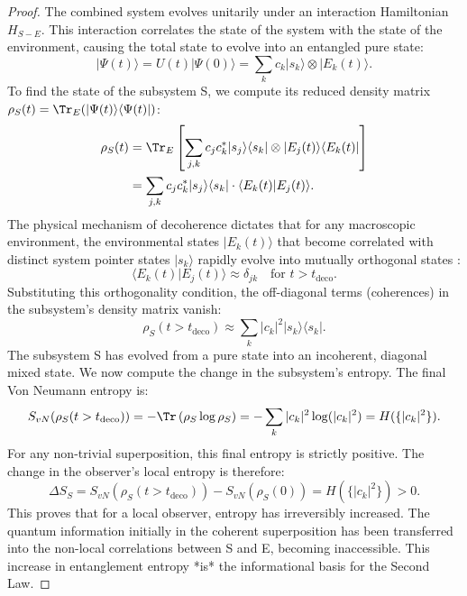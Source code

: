 \documentclass[11pt, letterpaper]{report}
\theoremstyle{plain} %
\theoremstyle{definition} %
\theoremstyle{remark} %
\begin{document}
\begin{proof}
The combined system evolves unitarily under an interaction Hamiltonian $H_{S-E}$. This interaction correlates the state of the system with the state of the environment, causing the total state to evolve into an entangled pure state:
\begin{equation}
    |\Psi(t)\rangle = U(t)|\Psi(0)\rangle = \sum_k c_k |s_k\rangle \otimes |E_k(t)\rangle.
    \label{eq:entangled_final_state}
\end{equation}
To find the state of the subsystem S, we compute its reduced density matrix $\rho_S(t) = \Tr_E(|\Psi(t)\rangle\langle\Psi(t)|)$:
\begin{align}
    \rho_S(t) &= \Tr_E \left[ \sum_{j,k} c_j c_k^* |s_j\rangle\langle s_k| \otimes |E_j(t)\rangle\langle E_k(t)| \right] \nonumber \\
              &= \sum_{j,k} c_j c_k^* |s_j\rangle\langle s_k| \cdot \langle E_k(t)|E_j(t)\rangle.
\end{align}
The physical mechanism of decoherence dictates that for any macroscopic environment, the environmental states $|E_k(t)\rangle$ that become correlated with distinct system pointer states $|s_k\rangle$ rapidly evolve into mutually orthogonal states \cite{Zurek2003, Schlosshauer2007}:
\begin{equation}
    \langle E_k(t)|E_j(t)\rangle \approx \delta_{jk} \quad \text{for } t > t_{\text{deco}}.
    \label{eq:env_orthogonality_final}
\end{equation}
Substituting this orthogonality condition, the off-diagonal terms (coherences) in the subsystem's density matrix vanish:
\begin{equation}
    \rho_S(t > t_{\text{deco}}) \approx \sum_k |c_k|^2 |s_k\rangle\langle s_k|.
    \label{eq:diagonalized_rho_S_final}
\end{equation}
The subsystem S has evolved from a pure state into an incoherent, diagonal mixed state. We now compute the change in the subsystem's entropy. The final Von Neumann entropy is:
\begin{equation}
    S_{vN}(\rho_S(t > t_{\text{deco}})) = -\Tr\left(\rho_S \log\rho_S\right) = -\sum_k |c_k|^2 \log(|c_k|^2) = H(\{|c_k|^2\}).
\end{equation}
For any non-trivial superposition, this final entropy is strictly positive. The change in the observer's local entropy is therefore:
\begin{equation}
    \Delta S_S = S_{vN}(\rho_S(t > t_{\text{deco}})) - S_{vN}(\rho_S(0)) = H(\{|c_k|^2\}) > 0.
\end{equation}
This proves that for a local observer, entropy has irreversibly increased. The quantum information initially in the coherent superposition has been transferred into the non-local correlations between S and E, becoming inaccessible. This increase in entanglement entropy *is* the informational basis for the Second Law.


\end{proof}
\end{document}
